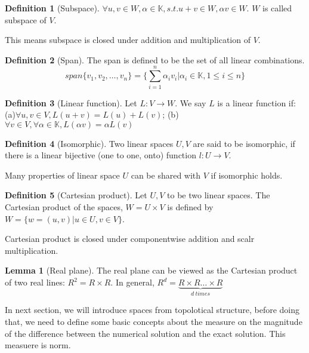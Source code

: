 \documentclass{article}
\theoremstyle{definition}
\newtheorem{definition}{Definition}[section]
\newtheorem{lemma}[theorem]{Lemma}
\begin{document}
\begin{definition}[Subspace]
$\forall u,v \in W, \alpha \in \mathbb{K}, s.t. u+v \in W, \alpha v \in W$. $W$ is called subspace of $V$.
\end{definition}

This means subspace is closed under addition and multiplication of $V$.

\begin{definition}[Span]
The  span is defined to be the set of all linear combinations.
\begin{equation}
span \{v_1,v_2,\ldots,v_n\}=\{\sum_{i=1}^{n}\alpha_iv_i | \alpha_i \in \mathbb{K}, 1\leq i \leq n\}
\end{equation}
\end{definition}


\begin{definition}[Linear function]

Let $L: V \to W$. We say $L$ is a linear function if: (a)$\forall u,v \in V, L(u+v)=L(u)+L(v)$; (b) $\forall v\in V, \forall 
\alpha \in \mathbb{K}, L(\alpha v)=\alpha L(v)$
\end{definition}



\begin{definition}[Isomorphic]
Two linear spaces $U, V$ are said to be isomorphic, if there is  a linear bijective (one to one, onto) function $l:U \to V$.
\end{definition}

Many properties of linear space $U$ can be shared with $V$ if isomorphic holds.


\begin{definition}[Cartesian product]

Let $U, V$ to be two linear spaces. The Cartesian product of the spaces, $W=U\times V$ is defined by $W=\{w=(u,v) | u\in U, v\in V\}$.
\end{definition}

Cartesian product is closed under componentwise addition and scalr multiplication.

\begin{lemma}[Real plane]
The real plane can be viewed as the Cartesian product of two real lines: $R^2=R\times R$. In general, $R^d=\underbrace{R\times R\ldots \times R }_{d \ times}$
\end{lemma}

In next section, we will introduce spaces from topolotical structure, before doing that, we need to define some basic concepts about the measure on the magnitude of the difference between the numerical solution and the exact solution. This measuere is norm.
\end{document}
